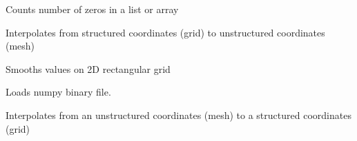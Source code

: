 \documentclass[letterpaper,10pt,english]{sphinxmanual}
\begin{document}
\begin{fulllineitems}
\label{\detokenize{ref/seisflows.tools:seisflows.tools.array.count_zeros}}
Counts number of zeros in a list or array

\end{fulllineitems}


\begin{fulllineitems}
\label{\detokenize{ref/seisflows.tools:seisflows.tools.array.grid2mesh}}
Interpolates from structured coordinates (grid) to unstructured
coordinates (mesh)

\end{fulllineitems}


\begin{fulllineitems}
\label{\detokenize{ref/seisflows.tools:seisflows.tools.array.gridsmooth}}
Smooths values on 2D rectangular grid

\end{fulllineitems}


\begin{fulllineitems}
\label{\detokenize{ref/seisflows.tools:seisflows.tools.array.loadnpy}}
Loads numpy binary file.

\end{fulllineitems}


\begin{fulllineitems}
\label{\detokenize{ref/seisflows.tools:seisflows.tools.array.mesh2grid}}
Interpolates from an unstructured coordinates (mesh) to a structured
coordinates (grid)

\end{fulllineitems}
\end{document}
